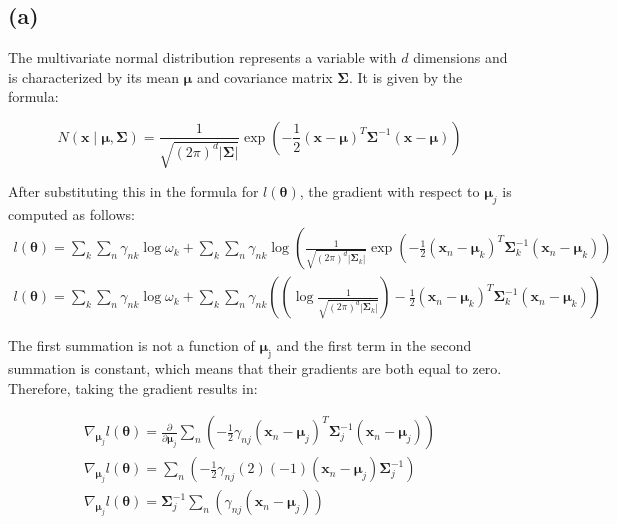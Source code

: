\documentclass[11pt]{article}
\newcommand{\sol}[1]{{\bf{\color{magenta}{{Solution:}}}}}
\begin{document}
\subsection{(a)}
\sol x The multivariate normal distribution represents a variable with $d$ dimensions and is characterized by its mean $\boldsymbol{\mu}$ and covariance matrix $\boldsymbol{\Sigma}$. It is given by the formula:

$$
N(\mathbf{x} \mid \boldsymbol{\mu}, \boldsymbol{\Sigma})=\frac{1}{\sqrt{(2 \pi)^{d}|\boldsymbol{\Sigma}|}} \exp \left(-\frac{1}{2}(\mathbf{x}-\boldsymbol{\mu})^{T} \boldsymbol{\Sigma}^{-1}(\mathbf{x}-\boldsymbol{\mu})\right)
$$

After substituting this in the formula for $l(\boldsymbol{\theta})$, the gradient with respect to $\boldsymbol{\mu}_{j}$ is computed as follows:
$$
\begin{gathered}
l(\boldsymbol{\theta})=\sum_{k} \sum_{n} \gamma_{n k} \log \omega_{k}+\sum_{k} \sum_{n} \gamma_{n k} \log \left(\frac{1}{\sqrt{(2 \pi)^{d}\left|\boldsymbol{\Sigma}_{k}\right|}} \exp \left(-\frac{1}{2}\left(\mathbf{x}_{n}-\boldsymbol{\mu}_{k}\right)^{T} \boldsymbol{\Sigma}_{k}^{-1}\left(\mathbf{x}_{n}-\boldsymbol{\mu}_{k}\right)\right)\right. \\
l(\boldsymbol{\theta})=\sum_{k} \sum_{n} \gamma_{n k} \log \omega_{k}+\sum_{k} \sum_{n} \gamma_{n k}\left(\left(\log \frac{1}{\sqrt{(2 \pi)^{d}\left|\boldsymbol{\Sigma}_{k}\right|}}\right)-\frac{1}{2}\left(\mathbf{x}_{n}-\boldsymbol{\mu}_{k}\right)^{T} \boldsymbol{\Sigma}_{k}^{-1}\left(\mathbf{x}_{n}-\boldsymbol{\mu}_{k}\right)\right)
\end{gathered}
$$

The first summation is not a function of $\boldsymbol{\mu}_{\mathrm{j}}$ and the first term in the second summation is constant, which means that their gradients are both equal to zero. Therefore, taking the gradient results in:

$$
\begin{gathered}
\nabla_{\boldsymbol{\mu}_{j}} l(\boldsymbol{\theta})=\frac{\partial}{\partial \boldsymbol{\mu}_{j}} \sum_{n}\left(-\frac{1}{2} \gamma_{n j}\left(\mathbf{x}_{n}-\boldsymbol{\mu}_{j}\right)^{T} \boldsymbol{\Sigma}_{j}^{-1}\left(\mathbf{x}_{n}-\boldsymbol{\mu}_{j}\right)\right) \\
\nabla_{\boldsymbol{\mu}_{j}} l(\boldsymbol{\theta})=\sum_{n}\left(-\frac{1}{2} \gamma_{n j}(2)(-1)\left(\mathbf{x}_{n}-\boldsymbol{\mu}_{j}\right) \boldsymbol{\Sigma}_{j}^{-1}\right) \\
\nabla_{\boldsymbol{\mu}_{j}} l(\boldsymbol{\theta})=\boldsymbol{\Sigma}_{j}^{-1} \sum_{n}\left(\gamma_{n j}\left(\mathbf{x}_{n}-\boldsymbol{\mu}_{j}\right)\right)
\end{gathered}
$$
\end{document}
